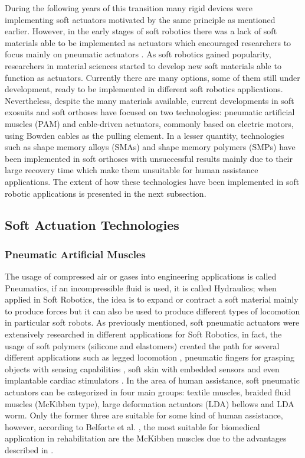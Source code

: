 During the following years of this transition many rigid devices were implementing soft actuators motivated by the same principle as mentioned earlier. However, in the early stages of soft robotics there was a lack of soft materials able to be implemented as actuators which encouraged researchers to focus mainly on pneumatic actuators \cite{Belforte2014}. As soft robotics gained popularity, researchers in material sciences started to develop new soft materials able to function as actuators. Currently there are many options, some of them still under development, ready to be implemented in different soft robotics applications. Nevertheless, despite the many materials available, current developments in soft exosuits and soft orthoses have focused on two technologies: pneumatic artificial muscles (PAM) and cable-driven actuators, commonly based on electric motors, using Bowden cables as the pulling element. In a lesser quantity, technologies such as shape memory alloys (SMAs) and shape memory polymers (SMPs) have been implemented in soft orthoses with unsuccessful results mainly due to their large recovery time which make them unsuitable for human assistance applications. The extent of how these technologies have been implemented in soft robotic applications is presented in the next subsection.

\subsection{Soft Actuation Technologies} \label{sec:SoftActuation}

\subsubsection{Pneumatic Artificial Muscles} \label{sec:PMAs}

The usage of compressed air or gases into engineering applications is called Pneumatics, if an incompressible fluid is used, it is called Hydraulics; when applied in Soft Robotics, the idea is to expand or contract a soft material mainly to produce forces but it can also be used to produce different types of locomotion in particular soft robots. As previously mentioned, soft pneumatic actuators were extensively researched in different applications for Soft Robotics, in fact, the usage of soft polymers (silicone and elastomers) created the path for several different applications such as legged locomotion \cite{Florez2014}, pneumatic fingers for grasping objects with sensing capabilities \cite{Morrow2015}, soft skin with embedded sensors \cite{Sonar2016,Suh2014} and even implantable cardiac stimulators \cite{Roche2014}. In the area of human assistance, soft pneumatic actuators can be categorized in four main groups: textile muscles, braided fluid muscles (McKibben type), large deformation actuators (LDA) bellows and LDA worm. Only the former three are suitable for some kind of human assistance, however, according to Belforte et al. \cite{Belforte2014}, the most suitable for biomedical application in rehabilitation are the McKibben muscles due to the advantages described in .


